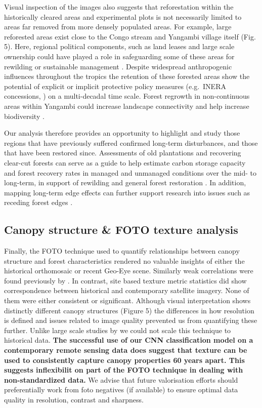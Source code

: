 \documentclass[remote sensing,article,submit,moreauthors,pdftex]{mdpi}
\begin{document}
Visual inspection of the images also suggests that reforestation within
the historically cleared areas and experimental plots is not necessarily
limited to areas far removed from more densely populated areas. For
example, large reforested areas exist close to the Congo stream and
Yangambi village itself (Fig. 5). Here, regional political components,
such as land leases and large scale ownership could have played a role
in safeguarding some of these areas for rewilding or sustainable
management \citep{arima2014, larson2011}. Despite widespread
anthropogenic influences throughout the tropics \citep{lewis2015} the
retention of these forested areas show the potential of explicit or
implicit protective policy measures (e.g.~INERA concessions,
\citet{bustillo2018}) on a multi-decadal time scale. Forest regrowth in
non-continuous areas within Yangambi could increase landscape
connectivity and help increase biodiversity \citep{vandeperre2018}.

Our analysis therefore provides an opportunity to highlight and study
those regions that have previously suffered confirmed long-term
disturbances, and those that have been restored since. Assessments of
old plantations and recovering clear-cut forests can serve as a guide to
help estimate carbon storage capacity and forest recovery rates in
managed and unmanaged conditions
\citep{gourlet-fleury2013, sader1988, achard2014} over the mid- to
long-term, in support of rewilding and general forest restoration
\citep{arima2014, larson2011, vandeperre2018}. In addition, mapping
long-term edge effects can further support research into issues such as
receding forest edges \citep{gascon2000}.

\hypertarget{canopy-structure-foto-texture-analysis-2}{%
\subsection{Canopy structure \& FOTO texture
analysis}\label{canopy-structure-foto-texture-analysis-2}}

Finally, the FOTO technique used to quantify relationships between
canopy structure and forest characteristics rendered no valuable
insights of either the historical orthomosaic or recent Geo-Eye scene.
Similarly weak correlations were found previously by
\citet{solorzano2018}. In contrast, site based texture metric statistics
did show correspondence between historical and contemporary satellite
imagery. None of them were either consistent or significant. Although
visual interpretation shows distinctly different canopy structures
(Figure 5) the differences in how resolution is defined and issues
related to image quality prevented us from quantifying these further.
Unlike large scale studies by \citet{Ploton2012} we could not scale this
technique to historical data. \textbf{The successful use of our CNN
classification model on a contemporary remote sensing data does suggest
that texture can be used to consistently capture canopy properties 60
years apart. This suggests inflexibilit on part of the FOTO technique in
dealing with non-standardized data.} We advise that future valorisation
efforts should preferentially work from foto negatives (if available) to
ensure optimal data quality in resolution, contrast and sharpness.
\end{document}
